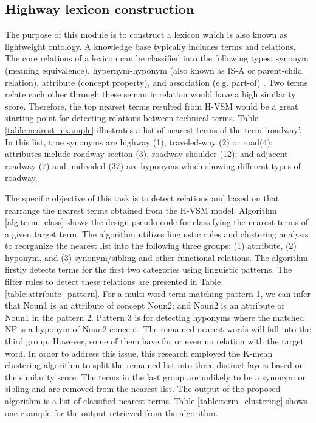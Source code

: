 \documentclass[Journal, InsideFigs, DoubleSpace]{ascelike} %
\begin{document}
\subsection{Highway lexicon construction}
The purpose of this module is to construct a lexicon which is also known as lightweight ontology. A knowledge base typically includes terms and relations. The core relations of a lexicon can be classified into the following types: synonym (meaning equivalence), hypernym-hyponym (also known as IS-A or parent-child relation), attribute (concept property), and association (e.g. part-of) \cite{jiang97,lee13}. Two terms relate each other through these semantic relation would have a high similarity score. Therefore, the top nearest terms resulted from H-VSM would be a great starting point for detecting relations between technical terms. Table \ref{table:nearest_example} illustrates a list of nearest terms of the term 'roadway'. In this list, true synonyms are highway (1), traveled-way (2) or road(4); attributes include roadway-section (3), roadway-shoulder (12); and adjacent-roadway (7) and undivided (37) are hyponyms which showing different types of roadway.
\par
The specific objective of this task is to detect relations and based on that rearrange the nearest terms obtained from the H-VSM model. Algorithm \ref{alg:term_class} shows the design pseudo code for classifying the nearest terms of a given target term. The algorithm utilizes linguistic rules and clustering analysis to reorganize the nearest list into the following three groups: (1) attribute, (2) hyponym, and (3) synonym/sibling and other functional relations. The algorithm firstly detects terms for the first two categories using linguistic patterns. The filter rules to detect these relations are presented in Table \ref{table:attribute_pattern}. For a multi-word term matching pattern 1, we can infer that Noun1 is an attribute of concept Noun2; and Noun2 is an attribute of Noun1 in the pattern 2. Pattern 3 is for detecting hyponyms where the matched NP is a hyponym of Noun2 concept.  The remained nearest words will fall into the third group. However, some of them have far or even no relation with the target word. In order to address this issue, this research employed the K-mean clustering algorithm \cite{macqueen67} to split the remained list into three distinct layers based on the similarity score. The terms in the last group are unlikely to be a synonym or sibling and are removed from the nearest list. The output of the proposed algorithm is a list of classified nearest terms. Table \ref{table:term_clustering} shows one example for the output retrieved from the algorithm. 
\end{document}
